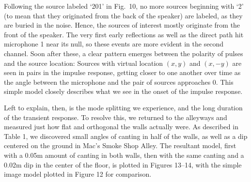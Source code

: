 \documentclass{aes137}
\begin{document}
Following the source labeled `201' in Fig.~10, no more sources beginning with `2' (to mean that they originated from the back of the speaker) are labeled, as they are buried in the noise. Hence, the sources of interest mostly originate from the front of the speaker. The very first early reflections as well as the direct path hit microphone 1 near its null, so these events are more evident in the second channel. Soon after these, a clear pattern emerges between the polarity of pulses and the source location: Sources with virtual location $(x,y)$ and $(x,-y)$ are seen in pairs in the impulse response, getting closer to one another over time as the angle between the microphone and the pair of sources approaches 0. This simple model closely describes what we see in the onset of the impulse response. 

%


Left to explain, then, is the mode splitting we experience, and the long duration of the transient response. To resolve this, we returned to the alleyways and measured just how flat and orthogonal the walls actually were. As described in Table 1, we discovered small angles of canting in half of the walls, as well as a dip centered on the ground in Mac's Smoke Shop Alley. The resultant model, first with a 0.05m amount of canting in both walls, then with the same canting and a 0.02m dip in the center of the floor, is plotted in Figures 13--14, with the simple image model plotted in Figure 12 for comparison.
\end{document}
